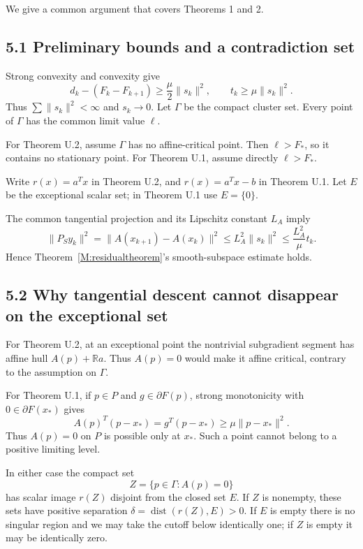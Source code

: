 We give a common argument that covers Theorems 1 and 2.

\subsection{5.1 Preliminary bounds and a contradiction
set}\label{U:preliminary-bounds-and-a-contradiction-set}

Strong convexity and convexity give \[
 d_k-(F_k-F_{k+1})\ge\frac\mu2\|s_k\|^2,
 \qquad t_k\ge\mu\|s_k\|^2.\tag{U.10}
\] Thus \(\sum\|s_k\|^2<\infty\) and \(s_k\to0\). Let \(\Gamma\) be the
compact cluster set. Every point of \(\Gamma\) has the common limit
value \(\ell\).

For Theorem U.2, assume \(\Gamma\) has no affine-critical point. Then
\(\ell>F_*\), so it contains no stationary point. For Theorem U.1, assume
directly \(\ell>F_*\).

Write \(r(x)=a^Tx\) in Theorem U.2, and \(r(x)=a^Tx-b\) in Theorem U.1. Let
\(E\) be the exceptional scalar set; in Theorem U.1 use \(E=\{0\}\).

The common tangential projection and its Lipschitz constant \(L_A\)
imply \[
 \|P_S y_k\|^2=\|A(x_{k+1})-A(x_k)\|^2
 \le L_A^2\|s_k\|^2\le\frac{L_A^2}{\mu}t_k.\tag{U.11}
\] Hence Theorem~\ref{M:residualtheorem}'s smooth-subspace estimate holds.

\subsection{5.2 Why tangential descent cannot disappear on the
exceptional
set}\label{U:why-tangential-descent-cannot-disappear-on-the-exceptional-set}

For Theorem U.2, at an exceptional point the nontrivial subgradient
segment has affine hull \(A(p)+\mathbb R a\). Thus \(A(p)=0\) would make
it affine critical, contrary to the assumption on \(\Gamma\).

For Theorem U.1, if \(p\in P\) and \(g\in\partial F(p)\), strong
monotonicity with \(0\in\partial F(x_*)\) gives \[
 A(p)^T(p-x_*)=g^T(p-x_*)\ge\mu\|p-x_*\|^2.
\] Thus \(A(p)=0\) on \(P\) is possible only at \(x_*\). Such a point
cannot belong to a positive limiting level.

In either case the compact set \[
 Z=\{p\in\Gamma:A(p)=0\}
\] has scalar image \(r(Z)\) disjoint from the closed set \(E\). If
\(Z\) is nonempty, these sets have positive separation
\(\delta=\operatorname{dist}(r(Z),E)>0\). If \(E\) is empty there is no
singular region and we may take the cutoff below identically one; if
\(Z\) is empty it may be identically zero.

